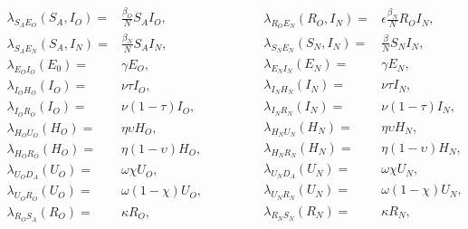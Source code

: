 \begin{equation}
\begin{aligned}
\lambda_{S_A E_O}(S_A, I_O)  =&  \frac{\beta_O}{N} S_A I_O,   \\
\lambda_{S_A E_N}(S_A, I_N)  =&  \frac{\beta_N}{N} S_A I_N,   \\
\lambda_{E_O I_O}(E_0)  =& \gamma E_O,    \\
\lambda_{I_O H_O}(I_O)  =& \nu \tau I_O,   \\
\lambda_{I_O R_O}(I_O)  =& \nu \left( 1 - \tau \right) I_O,   \\
\lambda_{H_O U_O}(H_O)  =& \eta  \upsilon H_O,   \\
\lambda_{H_O R_O}(H_O)  =& \eta  \left( 1 - \upsilon \right) H_O,   \\
\lambda_{U_O D_A}(U_O)  =& \omega \chi U_O, \\
\lambda_{U_O R_O}(U_O)  =& \omega \left( 1 - \chi \right) U_O, \\
\lambda_{R_O S_A}(R_O)  =& \kappa R_O, \\
\end{aligned}
\qquad \quad \quad
\begin{aligned}
\lambda_{R_O E_N}(R_O, I_N)  =& \epsilon \frac{\beta_N}{N} R_O I_N, \\
\lambda_{S_N E_N}(S_N, I_N)  =&  \frac{\beta}{N} S_N I_N,   \\
\lambda_{E_N I_N}(E_N)  =& \gamma E_N,    \\
\lambda_{I_N H_N}(I_N)  =& \nu \tau I_N,   \\
\lambda_{I_N R_N}(I_N)  =& \nu \left( 1 - \tau \right) I_N,   \\
\lambda_{H_N U_N}(H_N)  =& \eta  \upsilon H_N,   \\
\lambda_{H_N R_N}(H_N)  =& \eta  \left( 1 - \upsilon \right) H_N,   \\
\lambda_{U_N D_A}(U_N)  =& \omega \chi U_N, \\
\lambda_{U_N R_N}(U_N)  =& \omega \left( 1 - \chi \right) U_N, \\
\lambda_{R_N S_N}(R_N)  =& \kappa R_N, \\
\end{aligned}
\label{ch_5:eqn:transition_rates_simulation_model}
\end{equation}

